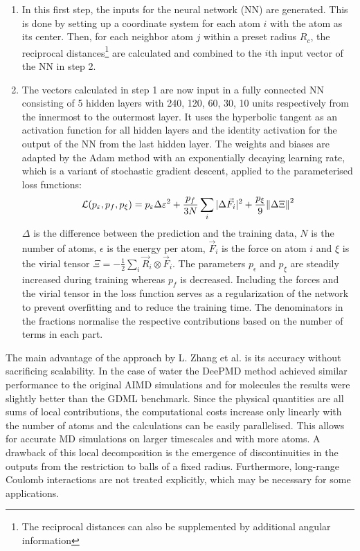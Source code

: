\begin{enumerate}
	\item In this first step, the inputs for the neural network (NN) are generated. This is done by setting up a coordinate system for each atom $i$ with the atom as its center. Then, for each neighbor atom $j$ within a preset radius $R_c$, the reciprocal distances\footnote{The reciprocal distances can also be supplemented by additional angular information} are calculated and combined to the $i$th input vector of the NN in step 2.
	\item The vectors calculated in step 1 are now input in a fully connected NN consisting of 5 hidden layers with 240, 120, 60, 30, 10 units respectively from the innermost to the outermost layer. It uses the hyperbolic tangent as an activation function for all hidden layers and the identity activation for the output of the NN from the last hidden layer. The weights and biases are adapted by the Adam method \cite{kingma2017adam} with an exponentially decaying learning rate, which is a variant of stochastic gradient descent, applied to the parameterised loss functions:
	$$\mathcal L (p_\varepsilon, p_f, p_\xi) = p_\varepsilon \Delta \varepsilon^2 + \frac{p_f}{3N} \sum_i |\Delta \vec F_i|^2 + \frac{p_\xi}{9} \norm{\Delta \Xi}^2$$
	$\Delta$ is the difference between the prediction and the training data, $N$ is the number of atoms, $\epsilon$ is the energy per atom, $\vec F_i$ is the force on atom $i$ and $\xi$ is the virial tensor $\Xi = - \frac{1}{2} \sum_i \vec R_i \otimes \vec F_i$. The parameters $p_\epsilon$ and $p_\xi$ are steadily increased during training whereas $p_f$ is decreased. Including the forces and the virial tensor in the loss function serves as a regularization of the network to prevent overfitting and to reduce the training time. The denominators in the fractions normalise the respective contributions based on the number of terms in each part.
\end{enumerate}
The main advantage of the approach by L. Zhang et al. is its accuracy without sacrificing  scalability. In the case of water the DeePMD method achieved similar performance to the original AIMD simulations and for molecules the results were slightly better than the GDML benchmark. Since the physical quantities are all sums of local contributions, the computational costs increase only linearly with the number of atoms and the calculations can be easily parallelised. This allows for accurate MD simulations on larger timescales and with more atoms. A drawback of this local decomposition is the emergence of discontinuities in the outputs from the restriction to balls of a fixed radius. Furthermore, long-range Coulomb interactions are not treated explicitly, which may be necessary for some applications.  
